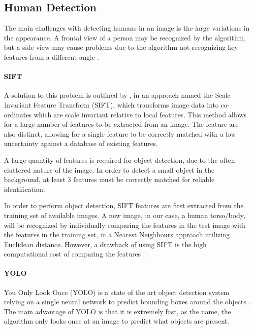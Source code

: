 \documentclass[12pt,a4paper]{report}
\begin{document}
\subsection{Human Detection}
The main challenges with detecting humans in an image is the large variations in the appearance. A frontal view of a person may be recognized by the algorithm, but a side view may cause problems due to the algorithm not recognizing key features from a different angle \citep{Dalal2004}.

\paragraph{SIFT} A solution to this problem is outlined by \cite{Lowe2004}, in an approach named the Scale Invariant Feature Transform (SIFT), which transforms image data into co-ordinates which are scale invariant relative to local features. This method allows for a large number of features to be extracted from an image. The feature are also distinct, allowing for a single feature to be correctly matched with a low uncertainty against a database of existing features.

A large quantity of features is required for object detection, due to the often cluttered nature of the image. In order to detect a small object in the background, at least 3 features must be correctly matched for reliable identification. 

In order to perform object detection, SIFT features are first extracted from the training set of available images. A new image, in our case, a human torso/body, will be recognized by individually comparing the features in the test image with the features in the training set, in a Nearest Neighbours approach utilizing Euclidean distance. However, a drawback of using SIFT is the high computational cost of comparing the features \citep{Wang2011}.

\paragraph{YOLO}
You Only Look Once (YOLO) is a state of the art object detection system relying on a single neural network to predict bounding boxes around the objects \citep{Redmon2015}. The main advantage of YOLO is that it is extremely fast, as the name, the algorithm only looks once at an image to predict what objects are present.
\end{document}
